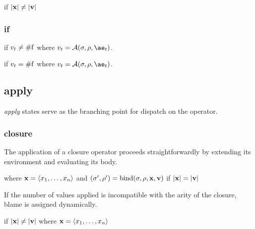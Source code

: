 \documentclass{sigplanconf}
\begin{document}
 if $|\mathbf{x}|\ne|\mathbf{v}|$

\subsubsection{if}

if $v_t\ne\mathrm{\#f}$
where $v_t=\A{\sigma}{\rho}{\ae_t}$.

if $v_t=\mathrm{\#f}$
where $v_t=\A{\sigma}{\rho}{\ae_t}$.





\subsection{apply}

\emph{apply} states serve as the branching point for dispatch on the operator.

\subsubsection{closure}

The application of a closure operator proceeds straightforwardly by extending its environment and evaluating its body.

where $\mathbf{x}=\langle x_1,\dots,x_n\rangle$ and $(\sigma',\rho')=\mathrm{bind}(\sigma,\rho,\mathbf{x},\mathbf{v})$ if $|\mathbf{x}|=|\mathbf{v}|$

If the number of values applied is incompatible with the arity of the closure, blame is assigned dynamically.

if $|\mathbf{x}|\ne|\mathbf{v}|$ where $\mathbf{x}=\langle x_1,\dots,x_n\rangle$
\end{document}
